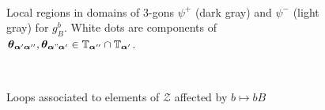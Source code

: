 \documentclass[11pt]{article}
\theoremstyle{plain} \newtheorem{thm}{Theorem}[subsection]
\theoremstyle{plain} \newtheorem{cor}[thm]{Corollary}
\theoremstyle{plain} \newtheorem{prop}[thm]{Proposition}
\theoremstyle{plain} \newtheorem{conj}[thm]{Conjecture}
\theoremstyle{plain} \newtheorem{lem}[thm]{Lemma}
\theoremstyle{definition} \newtheorem{df}[thm]{Definition}
\theoremstyle{remark} \newtheorem{rmk}[thm]{Remark}
\theoremstyle{remark} \newtheorem{obs}[thm]{Observation}
\newcommand{\Zcal}{\mathcal{Z}}
\newcommand{\ba}{\boldsymbol{\alpha}}
\newcommand{\thet}[1]{\boldsymbol{\theta}_{#1}}
\newcommand{\tor}[1]{\mathbb{T}_{#1}}
\begin{document}
\begin{figure}[h!]
\centering
{}
\\
\caption[Local components of 3-gon domains associated to the second handleslide for  $b \mapsto b B$]{Local regions in domains of 3-gons $\psi^{+}$ (dark gray) and $\psi^{-}$ (light gray) for $g_{B}^{b}$.  White dots are components of $\thet{\ba'\ba''},\thet{\ba"\ba'} \in \tor{\ba''} \cap \tor{\ba'}$.\label{fig:move3hs2}}
\end{figure}

\begin{figure}[h!]
\centering
{}\quad
{}\quad
{}\quad
{}\\
\quad
{}\quad
{}\quad
{}
\caption[Grading loops associated to $b \mapsto b B$]{Loops associated to elements of $\Zcal$ affected by $b \mapsto b B$\label{fig:move3loops}}
\end{figure}
\end{document}

